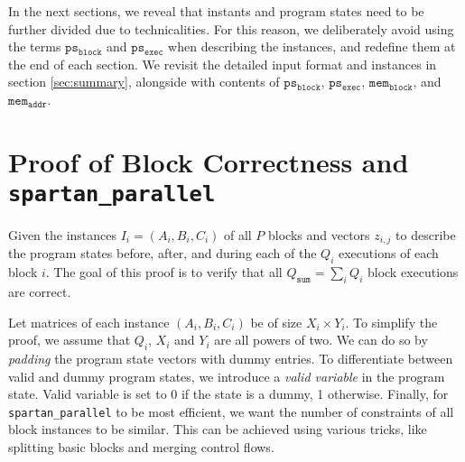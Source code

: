 \documentclass{article}
\newcommand{\code}{\texttt}
\newcommand{\Qsum}{Q_{\mathtt{sum}}}
\newcommand{\psb}{\mathtt{ps_{block}}}
\newcommand{\pse}{\mathtt{ps_{exec}}}
\newcommand{\memb}{\mathtt{mem_{block}}}
\newcommand{\mema}{\mathtt{mem_{addr}}}
\begin{document}
In the next sections, we reveal that instants and program states need to be further divided due to technicalities. For this reason, we deliberately avoid using the terms $\psb$ and $\pse$ when describing the instances, and redefine them at the end of each section. We revisit the detailed input format and instances in section \ref{sec:summary}, alongside with contents of $\psb$, $\pse$, $\memb$, and $\mema$.


\section{Proof of Block Correctness and \code{spartan\_parallel}}\label{sec:block_correctness}

Given the instances $I_i = (A_i, B_i, C_i)$ of all $P$ blocks and vectors $z_{i, j}$ to describe the program states before, after, and during each of the $Q_i$ executions of each block $i$. The goal of this proof is to verify that all $\Qsum = \sum_i Q_i$ block executions are correct.

Let matrices of each instance $(A_i, B_i, C_i)$ be of size $X_i \times Y_i$. To simplify the proof, we assume that $Q_i$, $X_i$ and $Y_i$ are all powers of two. We can do so by \emph{padding} the program state vectors with dummy entries. To differentiate between valid and dummy program states, we introduce a \emph{valid variable} in the program state. Valid variable is set to 0 if the state is a dummy, 1 otherwise. Finally, for \code{spartan\_parallel} to be most efficient, we want the number of constraints of all block instances to be similar. This can be achieved using various tricks, like splitting basic blocks and merging control flows.
\end{document}
